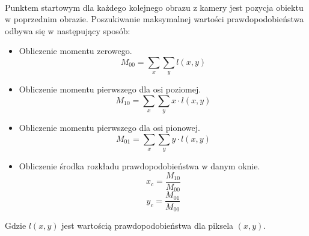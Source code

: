 \paragraph*{}
Punktem startowym dla każdego kolejnego obrazu z kamery jest pozycja obiektu w poprzednim obrazie. 
Poszukiwanie maksymalnej wartości prawdopodobieństwa odbywa się w następujący sposób:
\begin{itemize}
\item Obliczenie momentu zerowego.
\begin{equation}
M_{00}=\sum\limits_{x}\sum\limits_{y}l(x,y)
\end{equation}
\item Obliczenie momentu pierwszego dla osi poziomej.
\begin{equation}
M_{10}=\sum\limits_{x}\sum\limits_{y}x \cdot l(x,y)
\end{equation}
\item Obliczenie momentu pierwszego dla osi pionowej.
\begin{equation}
M_{01}=\sum\limits_{x}\sum\limits_{y}y \cdot l(x,y)
\end{equation}
\item Obliczenie środka rozkładu prawdopodobieństwa w danym oknie.
\begin{equation}
x_c=\frac{M_{10}}{M_{00}}
\end{equation}
\begin{equation}
y_c=\frac{M_{01}}{M_{00}}
\end{equation}
\end{itemize}
Gdzie \(l(x,y)\) jest wartością prawdopodobieństwa dla piksela \((x,y)\)\cite{BCV}.


